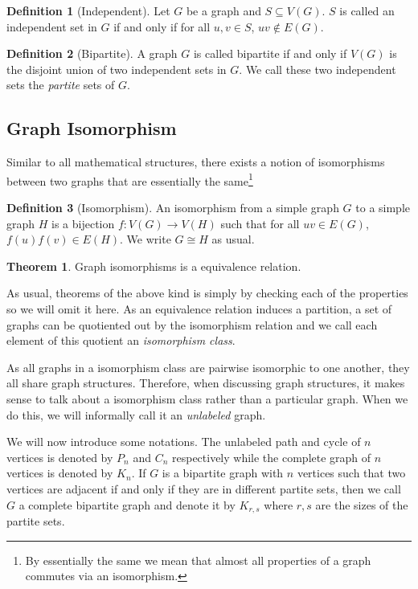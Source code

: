 \documentclass[
]{article}
\theoremstyle{definition}
\newtheorem{theorem}{Theorem}
\theoremstyle{definition}
\newtheorem{definition}{Definition}[section]
\begin{document}
\begin{definition}[Independent]
  Let \(G\) be a graph and \(S \subseteq V(G)\). \(S\) is called an independent 
  set in \(G\) if and only if for all \(u, v \in S\), \(uv \notin E(G)\).
\end{definition}

\begin{definition}[Bipartite]
  A graph \(G\) is called bipartite if and only if \(V(G)\) is the disjoint 
  union of two independent sets in \(G\). We call these two independent sets the 
  \textit{partite} sets of \(G\).
\end{definition}

\hypertarget{graph-isomorphism}{%
\subsection{Graph Isomorphism}\label{graph-isomorphism}}

Similar to all mathematical structures, there exists a notion of
isomorphisms between two graphs that are essentially the
same\footnote{By essentially the 
same we mean that almost all properties of a graph commutes via an isomorphism.}

\begin{definition}[Isomorphism]
  An isomorphism from a simple graph \(G\) to a simple graph \(H\) is a 
  bijection \(f : V(G) \to V(H)\) such that for all \(uv \in E(G)\), 
  \(f(u)f(v) \in E(H)\). We write \(G \cong H\) as usual.
\end{definition}

\begin{theorem}
  Graph isomorphisms is a equivalence relation.
\end{theorem}

As usual, theorems of the above kind is simply by checking each of the
properties so we will omit it here. As an equivalence relation induces a
partition, a set of graphs can be quotiented out by the isomorphism
relation and we call each element of this quotient an \emph{isomorphism
class}.

As all graphs in a isomorphism class are pairwise isomorphic to one
another, they all share graph structures. Therefore, when discussing
graph structures, it makes sense to talk about a isomorphism class
rather than a particular graph. When we do this, we will informally call
it an \emph{unlabeled} graph.

We will now introduce some notations. The unlabeled path and cycle of
\(n\) vertices is denoted by \(P_n\) and \(C_n\) respectively while the
complete graph of \(n\) vertices is denoted by \(K_n\). If \(G\) is a
bipartite graph with \(n\) vertices such that two vertices are adjacent
if and only if they are in different partite sets, then we call \(G\) a
complete bipartite graph and denote it by \(K_{r, s}\) where \(r, s\)
are the sizes of the partite sets.
\end{document}
